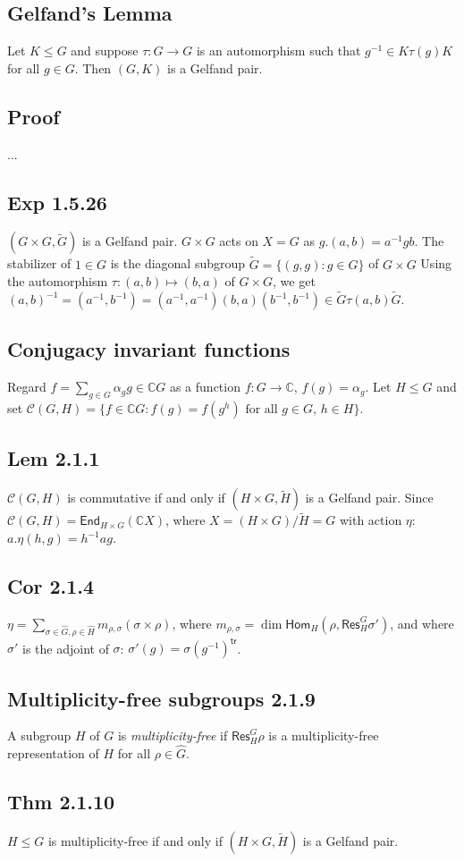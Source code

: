 \documentclass[a4paper]{amsart}
\newcommand{\C}{\mathbb{C}}
\newcommand{\CC}{\mathcal{C}}
\newcommand{\Hom}{\mathsf{Hom}}
\newcommand{\End}{\mathsf{End}}
\newcommand{\Res}{\mathsf{Res}}
\begin{document}
\subsection{Gelfand's Lemma}
Let $K \leq G$ and suppose $\tau \colon G \to G$ is an automorphism
such that $g^{-1} \in K \tau(g) K$ for all $g \in G$.  Then $(G, K)$ is
a Gelfand pair.

\subsection{Proof} ...



\subsection{Exp 1.5.26}
$(G \times G, \tilde{G})$ is a Gelfand pair.
$G \times G$ acts on $X = G$ as $g.(a,b) = a^{-1} g b$.
The stabilizer of $1 \in G$ is the diagonal subgroup $\tilde{G} = \{(g, g) : g \in G\}$ of $G \times G$
Using the automorphism $\tau \colon (a, b) \mapsto (b, a)$ of $G \times G$, we get $(a, b)^{-1} = (a^{-1}, b^{-1}) = 
(a^{-1}, a^{-1})(b, a)(b^{-1}, b^{-1}) \in 
\tilde{G}\tau(a,b)\tilde{G}$.


\subsection{Conjugacy invariant functions}
Regard $f = \sum_{g \in G} \alpha_g g \in \C G$ as a function
$f \colon G \to \C$, $f(g) = \alpha_g$.
Let $H \leq G$ and set 
$\CC(G, H) = \{ f \in \C G : f(g) = f(g^h) \text{ for all } g \in G,\, h \in H\}$.

\subsection{Lem 2.1.1}
$\CC(G, H)$ is commutative if and only if $(H \times G, \tilde{H})$ is
a Gelfand pair.  Since $\CC(G, H) = \End_{H \times G}(\C X)$, where $X
= (H \times G)/\tilde{H} = G$ with action $\eta:$ $a.\eta(h,g) = h^{-1}a g$.


\subsection{Cor 2.1.4}
$\eta = \sum_{\sigma \in \hat{G}, \rho \in \hat{H}} m_{\rho, \sigma} (\sigma \times \rho)$, where 
$m_{\rho, \sigma} = \dim \Hom_H(\rho, \Res^G_H \sigma')$,
and where $\sigma'$ is the adjoint of $\sigma$: $\sigma'(g) = \sigma(g^{-1})^{\mathsf{tr}}$.



\subsection{Multiplicity-free subgroups 2.1.9}
A subgroup $H$ of $G$ is \emph{multiplicity-free} if
$\Res^G_H \rho$ is a multiplicity-free representation of $H$ for all 
$\rho \in \hat{G}$.


\subsection{Thm 2.1.10} $H \leq G$ is multiplicity-free if and only if
$(H \times G, \tilde{H})$ is
a Gelfand pair.
\end{document}
